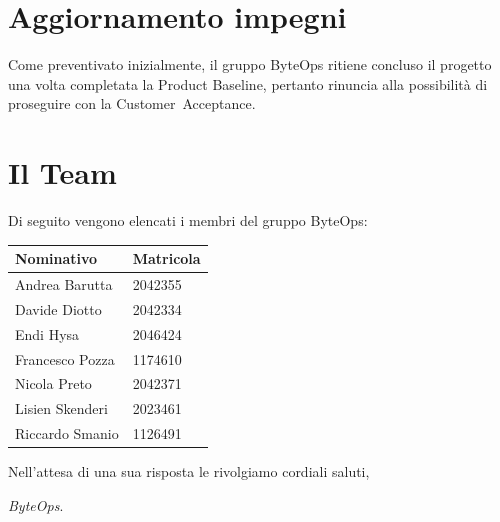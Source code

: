 \documentclass{article}
\begin{document}
\section{Aggiornamento impegni}
Come preventivato inizialmente, il gruppo ByteOps ritiene concluso il progetto una volta completata la Product Baseline, pertanto rinuncia alla possibilità di proseguire con la Customer Acceptance.

\section{Il Team}
Di seguito vengono elencati i membri del gruppo ByteOps:
\vspace{1cm}

\begin{center}
    \begin{tabular}{|C{4cm}|C{2cm}|}
    \hline
        \textbf{Nominativo} & \textbf{Matricola} \\
        \hline\hline
        Andrea Barutta  & 2042355 \\
        \hline
        Davide Diotto   & 2042334 \\ 
        \hline
        Endi Hysa       & 2046424 \\ 
        \hline
        Francesco Pozza & 1174610 \\ 
        \hline
        Nicola Preto    & 2042371 \\ 
        \hline
        Lisien Skenderi & 2023461 \\ 
        \hline
        Riccardo Smanio & 1126491 \\ 
        \hline
    \end{tabular}
\end{center}


\vspace{1cm}
Nell'attesa di una sua risposta le rivolgiamo cordiali saluti,

\vspace{0.3cm}

\textit{ByteOps}.
\end{document}

